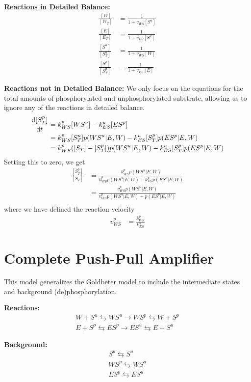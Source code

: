 \documentclass[aps,onecolumn,superscriptaddress,notitlepage]{revtex4-1}
\begin{document}
\textbf{Reactions in Detailed Balance:}
\begin{align}
\frac{[W]}{[W_T]} & = \frac{1}{1 + v_{WS}[S^u]}\label{eq:gbW}\\
\frac{[E]}{[E_T]} & = \frac{1}{1 + v_{ES}[S^p]}\label{eq:gbE}\\
\frac{[S^u]}{[S^u_T]} &= \frac{1}{1 + v_{WS}[W]}\label{eq:gbSu}\\
\frac{[S^p]}{[S^p_T]} &=  \frac{1}{1 + v_{ES}[E]}\label{eq:gbSp}
\end{align}

\textbf{Reactions not in  Detailed Balance:}
We only focus on the equations for the total amounts of phosphorylated and unphosphorylated substrate, allowing us to ignore any of the reactions in detailed balance.
\begin{align}
\dv{[S^p_T]}{t} &= k_{WS}^p[WS^u] - k_{ES}^u[ES^p]\\
&= k_{WS}^p[S^u_T]p(WS^u|E, W) - k_{ES}^u[S^p_T]p(ES^p|E, W)\\
&= k_{WS}^p([S_T]-[S^p_T])p(WS^u|E, W) - k_{ES}^u[S^p_T]p(ES^p|E, W)
\end{align}
Setting this to zero, we get
\begin{align}
\frac{[S_T^p]}{[S_T]} &= \frac{k_{WS}^p p(WS^u|E,W)}{k_{WS}^p p(WS^u|E,W) + k_{ES}^u p(ES^p|E,W)}\\
 &= \frac{v_{WS}^p p(WS^u|E,W)}{v_{WS}^p p(WS^u|E,W) + p(ES^p|E,W)}\\
\end{align}
where we have defined the reaction velocity
\begin{align}
v_{WS}^p &= \frac{k_{WS}^p}{k_{ES}^u}
\end{align}




\section{Complete Push-Pull Amplifier}

This model generalizes the Goldbeter model to include the intermediate states and background (de)phosphorylation.

\textbf{Reactions:}
\begin{gather}
W + S^u \leftrightarrows WS^u \rightarrow WS^p \leftrightarrows W + S^p\\
E + S^p \leftrightarrows ES^p \rightarrow ES^u \leftrightarrows E + S^u
\end{gather}

\textbf{Background:}
\begin{gather}
S^p \leftrightarrows S^u\\
WS^p  \leftrightarrows WS^u\\
ES^p  \leftrightarrows ES^u
\end{gather}
\end{document}

